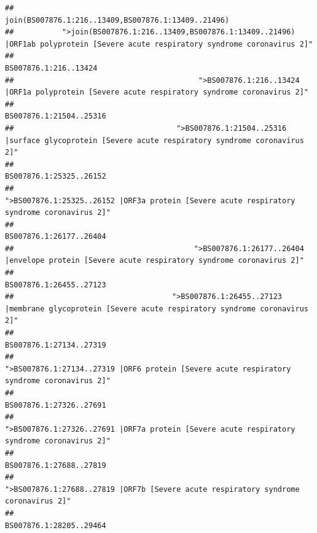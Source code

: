 \documentclass[
]{article}
\begin{document}
\begin{verbatim}
##                                                                                    join(BS007876.1:216..13409,BS007876.1:13409..21496) 
##           ">join(BS007876.1:216..13409,BS007876.1:13409..21496) |ORF1ab polyprotein [Severe acute respiratory syndrome coronavirus 2]" 
##                                                                                                                  BS007876.1:216..13424 
##                                          ">BS007876.1:216..13424 |ORF1a polyprotein [Severe acute respiratory syndrome coronavirus 2]" 
##                                                                                                                BS007876.1:21504..25316 
##                                     ">BS007876.1:21504..25316 |surface glycoprotein [Severe acute respiratory syndrome coronavirus 2]" 
##                                                                                                                BS007876.1:25325..26152 
##                                            ">BS007876.1:25325..26152 |ORF3a protein [Severe acute respiratory syndrome coronavirus 2]" 
##                                                                                                                BS007876.1:26177..26404 
##                                         ">BS007876.1:26177..26404 |envelope protein [Severe acute respiratory syndrome coronavirus 2]" 
##                                                                                                                BS007876.1:26455..27123 
##                                    ">BS007876.1:26455..27123 |membrane glycoprotein [Severe acute respiratory syndrome coronavirus 2]" 
##                                                                                                                BS007876.1:27134..27319 
##                                             ">BS007876.1:27134..27319 |ORF6 protein [Severe acute respiratory syndrome coronavirus 2]" 
##                                                                                                                BS007876.1:27326..27691 
##                                            ">BS007876.1:27326..27691 |ORF7a protein [Severe acute respiratory syndrome coronavirus 2]" 
##                                                                                                                BS007876.1:27688..27819 
##                                                    ">BS007876.1:27688..27819 |ORF7b [Severe acute respiratory syndrome coronavirus 2]" 
##                                                                                                                BS007876.1:28205..29464 

\end{verbatim}
\end{document}
